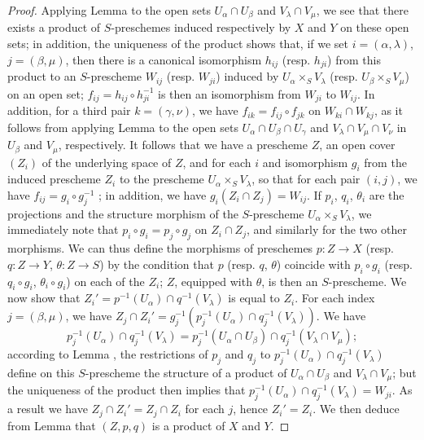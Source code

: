 \begin{proof}
Applying Lemma  to the open sets $U_\alpha\cap U_\beta$ and
$V_\lambda\cap V_\mu$, we see that there exists a product of $S$-preschemes induced
respectively by $X$ and $Y$ on these open sets; in addition, the uniqueness of the product
shows that, if we set $i=(\alpha,\lambda)$, $j=(\beta,\mu)$, then there is a canonical
isomorphism $h_{ij}$ (resp. $h_{ji}$) from this product to an $S$-prescheme $W_{ij}$
(resp. $W_{ji}$) induced by $U_\alpha\times_S V_\lambda$ (resp. $U_\beta\times_S V_\mu$) on
an open set; $f_{ij}=h_{ij}\circ h_{ji}^{-1}$ is then an isomorphism from $W_{ji}$ to
$W_{ij}$. In addition, for a third pair $k=(\gamma,\nu)$, we have
$f_{ik}=f_{ij}\circ f_{jk}$ on
$W_{ki}\cap W_{kj}$, as it follows from applying Lemma  to
the open sets $U_\alpha\cap U_\beta\cap U_\gamma$ and $V_\lambda\cap V_\mu\cap V_\nu$ in
$U_\beta$ and $V_\mu$, respectively. It follows that we have a prescheme $Z$, an open cover
$(Z_i)$ of the underlying space of $Z$, and for each $i$ and isomorphism $g_i$ from the
induced prescheme
$Z_i$ to the prescheme $U_\alpha\times_S V_\lambda$, so that for each pair $(i,j)$, we have
$f_{ij}=g_i\circ g_j^{-1}$ ; in addition, we have $g_i(Z_i\cap Z_j)=W_{ij}$.
If $p_i$, $q_i$, $\theta_i$ are the projections and the structure morphism of the
$S$-prescheme $U_\alpha\times_S V_\lambda$, we immediately note that
$p_i\circ g_i=p_j\circ g_j$ on $Z_i\cap Z_j$, and similarly for the two other morphisms. We
can thus define the morphisms of preschemes $p:Z\to X$ (resp. $q:Z\to Y$, $\theta:Z\to S$) by
the condition that $p$ (resp. $q$, $\theta$) coincide with $p_i\circ g_i$
(resp. $q_i\circ g_i$, $\theta_i\circ g_i$) on each of the $Z_i$; $Z$, equipped with
$\theta$, is then an $S$-prescheme. We now show that
$Z_i'=p^{-1}(U_\alpha)\cap q^{-1}(V_\lambda)$ is equal to $Z_i$. For each index
$j=(\beta,\mu)$, we have $Z_j\cap Z_i'=g_j^{-1}(p_j^{-1}(U_\alpha)\cap q_j^{-1}(V_\lambda))$.
We have
\[
  p_j^{-1}(U_\alpha)\cap q_j^{-1}(V_\lambda)
  =p_j^{-1}(U_\alpha\cap U_\beta)\cap q_j^{-1}(V_\lambda\cap V_\mu);
\]
according to Lemma , the restrictions of $p_j$ and $q_j$ to
$p_j^{-1}(U_\alpha)\cap q_j^{-1}(V_\lambda)$ define on this $S$-prescheme the structure of a
product of $U_\alpha\cap U_\beta$ and $V_\lambda\cap V_\mu$; but the uniqueness of the
product then implies that $p_j^{-1}(U_\alpha)\cap q_j^{-1}(V_\lambda)=W_{ji}$. As a result we
have $Z_j\cap Z_i'=Z_j\cap Z_i$ for each $j$, hence $Z_i'=Z_i$. We then deduce from
Lemma  that $(Z,p,q)$ is a product of $X$ and $Y$.


\end{proof}
